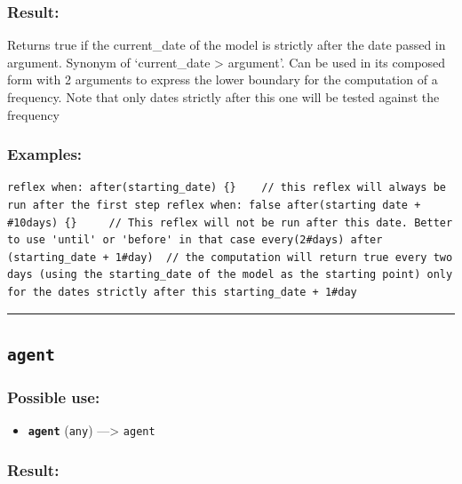 \documentclass[]{book}
\providecommand{\tightlist}{%
  \setlength{\itemsep}{0pt}\setlength{\parskip}{0pt}}
\theoremstyle{definition}
\theoremstyle{definition}
\theoremstyle{definition}
\theoremstyle{remark}
\begin{document}
\subsubsection{Result:}\label{result-23}

Returns true if the current\_date of the model is strictly after the
date passed in argument. Synonym of `current\_date \textgreater{}
argument'. Can be used in its composed form with 2 arguments to express
the lower boundary for the computation of a frequency. Note that only
dates strictly after this one will be tested against the frequency

\subsubsection{Examples:}\label{examples-18}

\begin{verbatim}
reflex when: after(starting_date) {}    // this reflex will always be run after the first step reflex when: false after(starting date + #10days) {}     // This reflex will not be run after this date. Better to use 'until' or 'before' in that case every(2#days) after (starting_date + 1#day)  // the computation will return true every two days (using the starting_date of the model as the starting point) only for the dates strictly after this starting_date + 1#day 
\end{verbatim}

\begin{center}\rule{0.5\linewidth}{\linethickness}\end{center}

\subsection{\texorpdfstring{\texttt{agent}}{agent}}\label{agent}

\subsubsection{Possible use:}\label{possible-use-25}

\begin{itemize}
\tightlist
\item
  \textbf{\texttt{agent}} (\texttt{any}) ---\textgreater{}
  \texttt{agent}
\end{itemize}

\subsubsection{Result:}\label{result-24}
\end{document}
